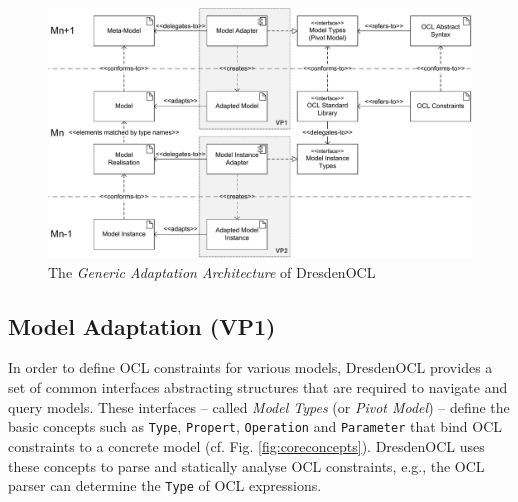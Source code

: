 \begin{figure}[p]
				\includegraphics[width=1.00\textwidth]{figures/modeladaptation.pdf}
			\caption{The \emph{Generic Adaptation Architecture} of DresdenOCL
			}
			\label{fig:modeladaptation}			
		\end{figure}

\subsection{Model Adaptation (VP1)}

	In order to define OCL constraints for various models,
	DresdenOCL provides a set of common interfaces abstracting structures
	that are required to navigate and query models.
	These interfaces -- called \emph{Model Types} (or \emph{Pivot Model}) \cite{braeuerOCL07} -- define
	the basic	concepts such as \texttt{Type}, \texttt{Propert}, \texttt{Operation} and \texttt{Parameter}
	that bind OCL constraints to a concrete model (cf. Fig. \ref{fig:coreconcepts}).
	DresdenOCL uses these concepts to parse and statically analyse OCL constraints, 
	e.g., the OCL parser	can determine the \texttt{Type} of OCL expressions.
	

